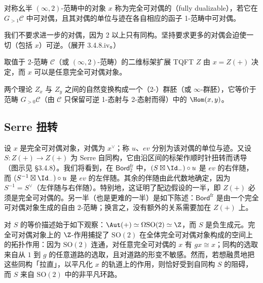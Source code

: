 \begin{definition}\label{def:3.4.10}
对称幺半 $(\infty,2)$-范畴中的对象 $x$ 称为完全可对偶的（fully dualizable），若它在 $G_{>1}\mathcal{C}$ 中可对偶，且其对偶的单位与迹在各自相应的函子 1-范畴中可对偶。
\end{definition}

\begin{remark}\label{rem:3.4.11}
我们不要求进一步的对偶，因为 2 以上只有同构。坚持要求更多的对偶会迫使一切（包括 $x$）可逆。（展开 3.4.8.iv。）
\end{remark}

\begin{theorem}\label{thm:3.4.12}
取值于 2-范畴 $\mathcal{C}$（或 $(\infty,2)$-范畴）的二维标架扩展 TQFT $Z$ 由 $x=Z(+)$ 决定，而 $x$ 可以是任意完全可对偶对象。

两个理论 $Z_x$ 与 $Z_y$ 之间的自然变换构成一个（2-）群胚（或 $\infty$-群胚），它等价于范畴 $G_{>0}\mathcal{C}$（由 $\mathcal{C}$ 只保留可逆 1-态射与 2-态射而得）中的 $\Hom(x,y)$。
\end{theorem}

\subsection{Serre 扭转}

设 $x$ 是完全可对偶对象，对偶为 $x^\vee$；称 $u$、$ev$ 分别为该对偶的单位与迹。又设 $S\colon Z(+)\to Z(+)$ 为 Serre 自同构，它由沿区间的标架作顺时针扭转而诱导（图示见 §3.4.8）。我们将看到，在 $\mathsf{Bord}^{\mathrm{fr}}_2$ 中，$(S\boxtimes\Id_-)\circ u$ 是 $ev$ 的右伴随，而 $(S^{-1}\boxtimes\Id_-)\circ u$ 是 $ev$ 的左伴随。其余的伴随由此代数地确定，因为 $S^{-1}=S^\vee$（左伴随与右伴随）。特别地，这证明了配边假设的一半，即 $Z(+)$ 必须是完全可对偶的。另一半（也是更难的一半）是如下陈述：$\mathsf{Bord}^{\mathrm{fr}}$ 是由一个完全可对偶对象生成的自由 2-范畴；换言之，没有额外的关系需要加在 $Z(+)$ 上。

\begin{remark}\label{rem:3.4.13}
对 $S$ 的等价描述始于如下观察：$\Aut(+)\simeq\Omega\mathrm{SO}(2)\simeq\Z$，而 $S$ 是负生成元。完全可对偶对象上的 $\Z$-作用捕捉了 $\mathrm{SO}(2)$ 在全体完全可对偶对象构成的空间上的拓扑作用：因为 $\mathrm{SO}(2)$ 连通，对任意完全可对偶的 $x$ 有 $gx\cong x$；同构的选取来自从 $1$ 到 $g$ 的任意道路的选取，且对道路的形变不敏感。然而，若想融贯地把这些同构「拉直」，以平凡化 $x$ 的轨道上的作用，则恰好受到自同构 $S$ 的阻碍，而 $S$ 来自 $\mathrm{SO}(2)$ 中的非平凡环路。
\end{remark}

